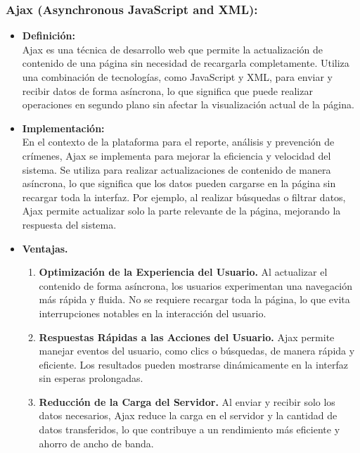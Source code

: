 \documentclass{article}
\begin{document}
        \subsubsection{Ajax (Asynchronous JavaScript and XML):}
            \begin{itemize}
                \item \textbf{Definición:}\\
                Ajax es una técnica de desarrollo web que permite la actualización de contenido de una página sin necesidad de recargarla completamente. Utiliza una combinación de tecnologías, como JavaScript y XML, para enviar y recibir datos de forma asíncrona, lo que significa que puede realizar operaciones en segundo plano sin afectar la visualización actual de la página.

                \item \textbf{Implementación:}\\
                En el contexto de la plataforma para el reporte, análisis y prevención de crímenes, Ajax se implementa para mejorar la eficiencia y velocidad del sistema. Se utiliza para realizar actualizaciones de contenido de manera asíncrona, lo que significa que los datos pueden cargarse en la página sin recargar toda la interfaz. Por ejemplo, al realizar búsquedas o filtrar datos, Ajax permite actualizar solo la parte relevante de la página, mejorando la respuesta del sistema.

                \item \textbf{Ventajas.}
                \begin{enumerate}
                    \item \textbf{Optimización de la Experiencia del Usuario.} Al actualizar el contenido de forma asíncrona, los usuarios experimentan una navegación más rápida y fluida. No se requiere recargar toda la página, lo que evita interrupciones notables en la interacción del usuario.

                    \item \textbf{Respuestas Rápidas a las Acciones del Usuario.} Ajax permite manejar eventos del usuario, como clics o búsquedas, de manera rápida y eficiente. Los resultados pueden mostrarse dinámicamente en la interfaz sin esperas prolongadas.

                    \item \textbf{Reducción de la Carga del Servidor.} Al enviar y recibir solo los datos necesarios, Ajax reduce la carga en el servidor y la cantidad de datos transferidos, lo que contribuye a un rendimiento más eficiente y ahorro de ancho de banda.


\end{enumerate}
\end{itemize}
\end{document}
